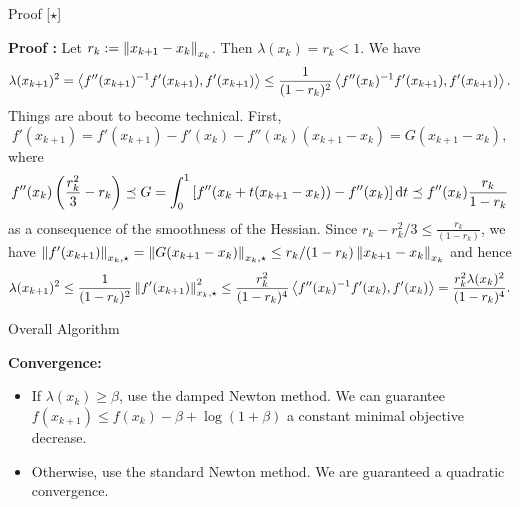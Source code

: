 \documentclass[9pt]{beamer}
\begin{document}
\begin{frame}{Proof [$\star$]}

  \textbf{Proof :} Let $r_k:= \left\|x_{k+1}-x_k\right\|_{x_k}$. Then $\lambda(x_k)=r_k<1$. We have
  \[
    \lambda(x_{k+1})^2 = \left<f''(x_{k+1})^{-1} f'(x_{k+1}), f'(x_{k+1})\right> \leq \frac{1}{(1-r_k)^2} \left<f''(x_k)^{-1} f'(x_{k+1}), f'(x_{k+1})\right>.
  \]
  Things are about to become technical. First,
  \[
    f'(x_{k+1}) = f'(x_{k+1})-f'(x_k) - f''(x_k)(x_{k+1}-x_k) = G(x_{k+1}-x_k),
  \]
  where
  \[
    f''(x_k) \left(\frac{r_k^2}{3}-r_k\right) \preceq G = \int_0^1 \left[f''(x_k + t (x_{k+1}-x_k))-f''(x_k)\right] {\mathrm{d}} t \preceq f''(x_k)\frac{r_k}{1-r_k}
  \]
  as a consequence of the smoothness of the Hessian. Since $r_k-r_k^2/3 \leq \tfrac{r_k}{(1-r_k)}$, we have $\left\|f'(x_{k+1})\right\|_{x_k,\star}=\left\|G(x_{k+1}-x_k)\right\|_{x_k,\star}\leq {r_k}/{(1-r_k)}\left\|x_{k+1}-x_k\right\|_{x_k}$ and hence
  \[
    \lambda(x_{k+1})^2 \leq \frac{1}{(1-r_k)^2}\left\|f'(x_{k+1})\right\|^2_{x_k, \star} \leq \frac{r_k^2}{(1-r_k)^4} \left<f''(x_k)^{-1} f'(x_k), f'(x_k)\right>=\frac{r_k^2\lambda(x_k)^2}{(1-r_k)^4}.
  \]
\end{frame}


\begin{frame}{Overall Algorithm}


  \begin{algorithm}[H]
    \caption{\emph{Newton switching method}}
  \end{algorithm}
  
  \vfill

  \textbf{Convergence:}
  \begin{itemize}
  \item If $\lambda(x_k) \geq \beta$, use the damped Newton method. We can guarantee $f(x_{k+1}) \leq f(x_k) - \beta + \log(1+\beta)$ a constant minimal objective decrease.
  \item Otherwise, use the standard Newton method. We are guaranteed a quadratic convergence.
  \end{itemize}
\end{frame}
\end{document}
